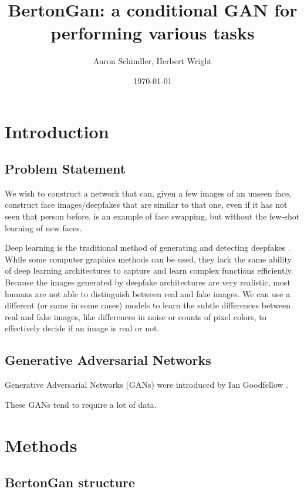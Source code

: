 \documentclass{article}
\title{BertonGan: a conditional GAN for performing various tasks}
\author{ Aaron Schindler, Herbert Wright }
\date{\today}
\begin{document}
\maketitle
\pagebreak

\section{Introduction}

\subsection{Problem Statement}

We wish to construct a network that can, given a few images of an unseen face,
construct face images/deepfakes that are similar to that one, even if it has not
seen that person before. \cite{lin2020using} is an example of face swapping, but without the
few-shot learning of new faces.

Deep learning is the traditional method of generating and detecting deepfakes \cite{nguyen2022deep}.
While some computer graphics methods can be used, they lack the same ability
of deep learning architectures to capture and learn complex functions efficiently.
Because the images generated by deepfake architectures are very realistic, most
humans are not able to distinguish between real and fake images. We can
use a different (or same in some cases) models to learn the subtle differences
between real and fake images, like differences in noise or counts of pixel colors,
to effectively decide if an image is real or not.

\subsection{Generative Adversarial Networks}

Generative Adversarial Networks (GANs) were introduced by Ian Goodfellow \cite{goodfellow2020generative}.

These GANs tend to require a lot of data.


\section{Methods}

\subsection{BertonGan structure}
\end{document}
